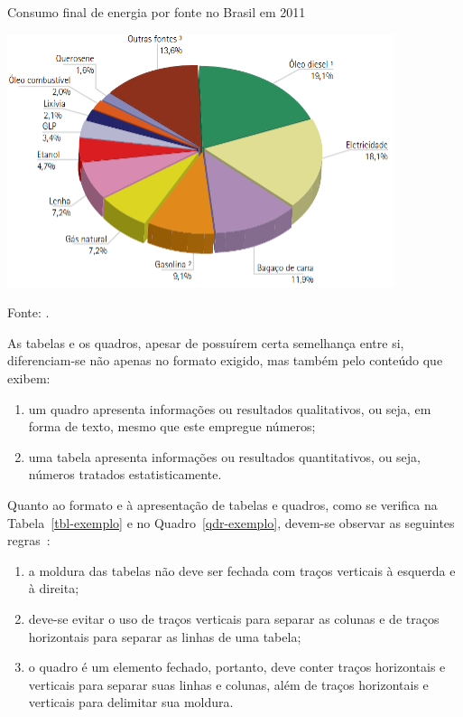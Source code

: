 \documentclass[10pt, a4paper]{article}
\begin{document}
\begin{grafico}[h]
	\centering
	\caption{Consumo final de energia por fonte no Brasil em 2011}
	\label{graf-exemplo}
	\includegraphics[width=.75\textwidth]{graf-exemplo}	
	\caption*{Fonte: \cite{epe:ben2011}.}
\end{grafico}

As tabelas e os quadros, apesar de possuírem certa semelhança entre si, diferenciam-se não apenas no formato exigido, mas também pelo conteúdo que exibem:

\begin{enumerate}[label=\alph*)]
	\item um quadro apresenta informações ou resultados qualitativos, ou seja, em forma de texto, mesmo que este empregue números;
	\item uma tabela apresenta informações ou resultados quantitativos, ou seja, números tratados estatisticamente.
\end{enumerate}

Quanto ao formato e à apresentação de tabelas e quadros, como se verifica na Tabela~\ref{tbl-exemplo} e no Quadro~\ref{qdr-exemplo}, devem-se observar as seguintes regras~\citep{fibge:nat1993}:

\begin{enumerate}[label=\alph*)]
	\item a moldura das tabelas não deve ser fechada com traços verticais à esquerda e à direita;
	\item deve-se evitar o uso de traços verticais para separar as colunas e de traços horizontais para separar as linhas de uma tabela;
	\item o quadro é um elemento fechado, portanto, deve conter traços horizontais e verticais para separar suas linhas e colunas, além de traços horizontais e verticais para delimitar sua moldura.
\end{enumerate}
\end{document}
